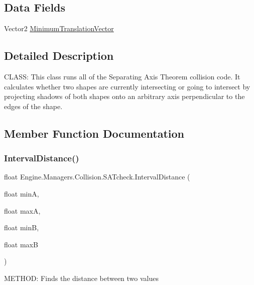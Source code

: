 \subsection*{Data Fields}
\begin{DoxyCompactItemize}
\item 
Vector2 \hyperlink{a00510_a307c7f32a47949b280ac2a9d7b174899}{Minimum\+Translation\+Vector}
\end{DoxyCompactItemize}


\subsection{Detailed Description}
C\+L\+A\+SS\+: This class runs all of the Separating Axis Theorem collision code. It calculates whether two shapes are currently intersecting or going to intersect by projecting shadows of both shapes onto an arbitrary axis perpendicular to the edges of the shape. 



\subsection{Member Function Documentation}
\mbox{\label{a00510_a5e692998d63a129d3fed2163bcbf8a55}} 
\subsubsection{\texorpdfstring{Interval\+Distance()}{IntervalDistance()}}
{\footnotesize\ttfamily float Engine.\+Managers.\+Collision.\+S\+A\+Tcheck.\+Interval\+Distance (\begin{DoxyParamCaption}\item[{float}]{minA,  }\item[{float}]{maxA,  }\item[{float}]{minB,  }\item[{float}]{maxB }\end{DoxyParamCaption})\hspace{0.3cm}{\ttfamily [inline]}}



M\+E\+T\+H\+OD\+: Finds the distance between two values 


